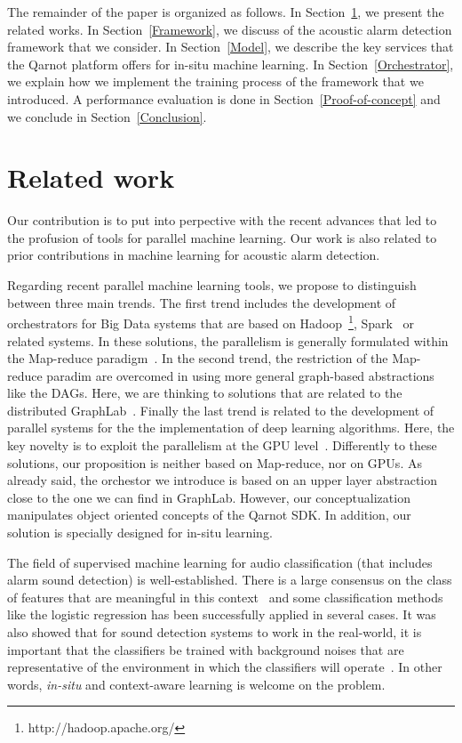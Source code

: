 \documentclass[10pt, conference, compsocconf]{IEEEtran}
\begin{document}
The remainder of the paper is organized as follows. In Section~\ref{Related}, we present the related works. 
In Section~\ref{Framework}, we discuss of the acoustic alarm detection framework that we consider. In Section~\ref{Model}, we describe 
the key services that the Qarnot platform offers for in-situ machine learning. In Section~\ref{Orchestrator}, we explain 
how we implement the training process of the framework that we introduced. A performance evaluation is done in 
Section~\ref{Proof-of-concept} and we conclude in Section~\ref{Conclusion}.




\section{Related work} \label{Related}


Our contribution is to put into perpective with the recent advances that led to the profusion of tools for parallel 
machine learning. Our work is also related to prior contributions in machine learning for acoustic alarm detection. 

Regarding recent parallel machine learning tools, we propose to distinguish between three main trends. 
The first trend includes the development of orchestrators for Big Data systems that are based on Hadoop~\footnote{http://hadoop.apache.org/}, Spark~\cite{Zaharia:2010:SCC:1863103.1863113} or related systems. 
In these solutions, the parallelism is generally formulated within the Map-reduce paradigm~\cite{DBLP:journals/cacm/DeanG10}. 
In the second trend, the restriction of the Map-reduce paradim are overcomed in using more general graph-based abstractions like 
the DAGs. Here, we are thinking to solutions that are related to 
the distributed GraphLab~\cite{Low:2012:DGF:2212351.2212354}.  Finally the last trend is related to the development of parallel 
systems for the the implementation of deep learning algorithms. Here, the key novelty is to exploit the parallelism at the GPU 
level~\cite{Raina:2009:LDU:1553374.1553486}.
Differently to these solutions, our proposition is neither based on Map-reduce, nor on GPUs. As already said, the orchestor we introduce 
is based on an upper layer abstraction close to the one we can find in GraphLab. However, our conceptualization manipulates object 
oriented concepts of the Qarnot SDK. In addition, our solution is specially designed for in-situ learning. 


The field of supervised machine learning for audio classification (that includes alarm sound detection) is well-established. There is a 
large consensus on the class of features that are meaningful in this context~\cite{Mckinney03featuresfor,DBLP:journals/taslp/JoderER09} 
and some classification 
methods like the logistic regression has been successfully applied in several cases. It was also showed 
that for sound detection systems to work in the real-world, it is important that the classifiers be trained with 
background noises that are representative of the environment in which the classifiers will operate~\cite{DBLP:conf/icassp/SalamonB15}. 
In other words, {\it in-situ} and context-aware learning is welcome on the problem. 
\end{document}
